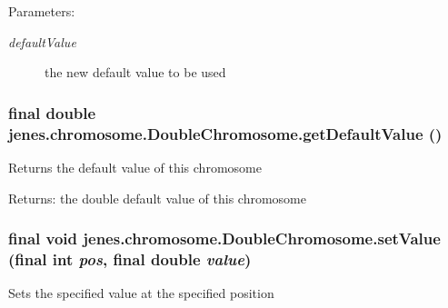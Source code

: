 \begin{Desc}
\item[Parameters:]
\begin{description}
\item[{\em defaultValue}]the new default value to be used \end{description}
\end{Desc}
\hypertarget{classjenes_1_1chromosome_1_1_double_chromosome_e129a0daa2e01593859f5b26c508d36b}{
\subsubsection[getDefaultValue]{\setlength{\rightskip}{0pt plus 5cm}final double jenes.chromosome.DoubleChromosome.getDefaultValue ()}}
\label{classjenes_1_1chromosome_1_1_double_chromosome_e129a0daa2e01593859f5b26c508d36b}


Returns the default value of this chromosome 

\begin{Desc}
\item[Returns:]the double default value of this chromosome \end{Desc}
\hypertarget{classjenes_1_1chromosome_1_1_double_chromosome_4581d7735d8ed661473b0e72ff19f956}{
\subsubsection[setValue]{\setlength{\rightskip}{0pt plus 5cm}final void jenes.chromosome.DoubleChromosome.setValue (final int {\em pos}, \/  final double {\em value})}}
\label{classjenes_1_1chromosome_1_1_double_chromosome_4581d7735d8ed661473b0e72ff19f956}


Sets the specified value at the specified position 

